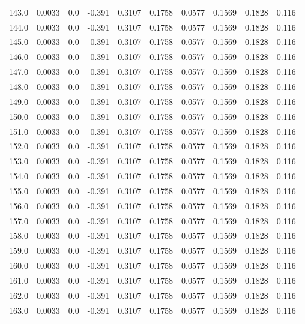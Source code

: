 \begin{longtable}{lrrrrrrrrr}
143.0 & 0.0033 & 0.0 & -0.391 & 0.3107 & 0.1758 & 0.0577 & 0.1569 & 0.1828 & 0.116 \\
144.0 & 0.0033 & 0.0 & -0.391 & 0.3107 & 0.1758 & 0.0577 & 0.1569 & 0.1828 & 0.116 \\
145.0 & 0.0033 & 0.0 & -0.391 & 0.3107 & 0.1758 & 0.0577 & 0.1569 & 0.1828 & 0.116 \\
146.0 & 0.0033 & 0.0 & -0.391 & 0.3107 & 0.1758 & 0.0577 & 0.1569 & 0.1828 & 0.116 \\
147.0 & 0.0033 & 0.0 & -0.391 & 0.3107 & 0.1758 & 0.0577 & 0.1569 & 0.1828 & 0.116 \\
148.0 & 0.0033 & 0.0 & -0.391 & 0.3107 & 0.1758 & 0.0577 & 0.1569 & 0.1828 & 0.116 \\
149.0 & 0.0033 & 0.0 & -0.391 & 0.3107 & 0.1758 & 0.0577 & 0.1569 & 0.1828 & 0.116 \\
150.0 & 0.0033 & 0.0 & -0.391 & 0.3107 & 0.1758 & 0.0577 & 0.1569 & 0.1828 & 0.116 \\
151.0 & 0.0033 & 0.0 & -0.391 & 0.3107 & 0.1758 & 0.0577 & 0.1569 & 0.1828 & 0.116 \\
152.0 & 0.0033 & 0.0 & -0.391 & 0.3107 & 0.1758 & 0.0577 & 0.1569 & 0.1828 & 0.116 \\
153.0 & 0.0033 & 0.0 & -0.391 & 0.3107 & 0.1758 & 0.0577 & 0.1569 & 0.1828 & 0.116 \\
154.0 & 0.0033 & 0.0 & -0.391 & 0.3107 & 0.1758 & 0.0577 & 0.1569 & 0.1828 & 0.116 \\
155.0 & 0.0033 & 0.0 & -0.391 & 0.3107 & 0.1758 & 0.0577 & 0.1569 & 0.1828 & 0.116 \\
156.0 & 0.0033 & 0.0 & -0.391 & 0.3107 & 0.1758 & 0.0577 & 0.1569 & 0.1828 & 0.116 \\
157.0 & 0.0033 & 0.0 & -0.391 & 0.3107 & 0.1758 & 0.0577 & 0.1569 & 0.1828 & 0.116 \\
158.0 & 0.0033 & 0.0 & -0.391 & 0.3107 & 0.1758 & 0.0577 & 0.1569 & 0.1828 & 0.116 \\
159.0 & 0.0033 & 0.0 & -0.391 & 0.3107 & 0.1758 & 0.0577 & 0.1569 & 0.1828 & 0.116 \\
160.0 & 0.0033 & 0.0 & -0.391 & 0.3107 & 0.1758 & 0.0577 & 0.1569 & 0.1828 & 0.116 \\
161.0 & 0.0033 & 0.0 & -0.391 & 0.3107 & 0.1758 & 0.0577 & 0.1569 & 0.1828 & 0.116 \\
162.0 & 0.0033 & 0.0 & -0.391 & 0.3107 & 0.1758 & 0.0577 & 0.1569 & 0.1828 & 0.116 \\
163.0 & 0.0033 & 0.0 & -0.391 & 0.3107 & 0.1758 & 0.0577 & 0.1569 & 0.1828 & 0.116 \\

\end{longtable}
